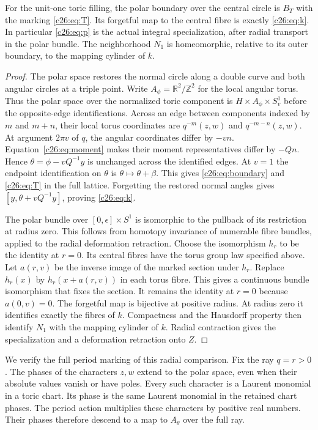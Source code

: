 \begin{theorem}\label{c26:thm:actual}
For the unit-one toric filling, the polar boundary over the central
circle is $B_T$ with the marking \eqref{c26:eq:T}.
Its forgetful map to the central fibre is exactly \eqref{c26:eq:k}.
In particular \eqref{c26:eq:p} is the actual integral specialization,
after radial transport in the polar bundle.
The neighborhood $N_1$ is homeomorphic, relative to its outer boundary,
to the mapping cylinder of $k$.
\end{theorem}
\begin{proof}
The polar space restores the normal circle along a double curve and
both angular circles at a triple point.
Write $A_\phi=\mathbb R^2/\mathbb Z^2$ for the local angular torus.
Thus the polar space over the normalized toric component is
$H\times A_\phi\times S^1_v$ before the opposite-edge identifications.
Across an edge between components indexed by $m$ and $m+n$, their
local torus coordinates are $q^{-m}(z,w)$ and $q^{-m-n}(z,w)$.
At argument $2\pi v$ of $q$, the angular coordinates differ by $-vn$.
Equation~\eqref{c26:eq:moment} makes their moment representatives
differ by $-Qn$.
Hence $\theta=\phi-vQ^{-1}y$ is unchanged across the identified edges.
At $v=1$ the endpoint identification on $\theta$ is
$\theta\mapsto\theta+\beta$.
This gives \eqref{c26:eq:boundary} and \eqref{c26:eq:T} in the full lattice.
Forgetting the restored normal angles gives
$[y,\theta+vQ^{-1}y]$, proving \eqref{c26:eq:k}.

The polar bundle over $[0,\epsilon]\times S^1$ is isomorphic to the
pullback of its restriction at radius zero.
This follows from homotopy invariance of numerable fibre bundles,
applied to the radial deformation retraction.
Choose the isomorphism $h_r$ to be the identity at $r=0$.
Its central fibres have the torus group law specified above.
Let $a(r,v)$ be the inverse image of the marked section under $h_r$.
Replace $h_r(x)$ by $h_r(x+a(r,v))$ in each torus fibre.
This gives a continuous bundle isomorphism that fixes the section.
It remains the identity at $r=0$ because $a(0,v)=0$.
The forgetful map is bijective at positive radius.
At radius zero it identifies exactly the fibres of $k$.
Compactness and the Hausdorff property then identify $N_1$ with the
mapping cylinder of $k$. Radial contraction gives the specialization
and a deformation retraction onto $Z$.
\end{proof}

We verify the full period marking of this radial comparison.
Fix the ray $q=r>0$.
The phases of the characters $z,w$ extend to the polar space,
even when their absolute values vanish or have poles.
Every such character is a Laurent monomial in a toric chart.
Its phase is the same Laurent monomial in the retained chart phases.
The period action multiplies these characters by positive real numbers.
Their phases therefore descend to a map to $A_\theta$ over the full ray.

